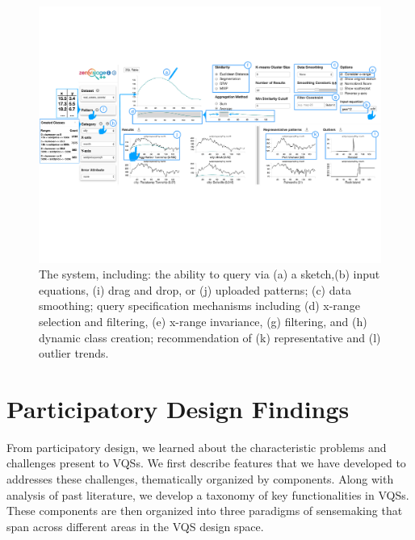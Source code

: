 \begin{figure}[ht!]
\centering
\vspace{-15pt}
\includegraphics[width=\linewidth]{figures/zvpp_system.pdf} %
\vspace{-5pt}\caption{The \zvpp system, including: the ability to query via (a) a sketch,(b) input equations, (i) drag and drop, or (j) uploaded patterns; (c) data smoothing; query specification mechanisms including (d) x-range selection and filtering, (e) x-range invariance, (g) filtering, and (h) dynamic class creation; recommendation of (k) representative and (l) outlier trends.} %
\label{zvOverview}
\vspace{-14pt}
\end{figure}
\section{Participatory Design Findings\label{sec:pd_findings}}
From participatory design, we learned about the characteristic problems and challenges present to VQSs. We first describe features that we have developed to addresses these challenges, thematically organized by components. %
Along with analysis of past literature, we develop a taxonomy of key functionalities in VQSs. These components are then organized into three paradigms of sensemaking that span across different areas in the VQS design space.
